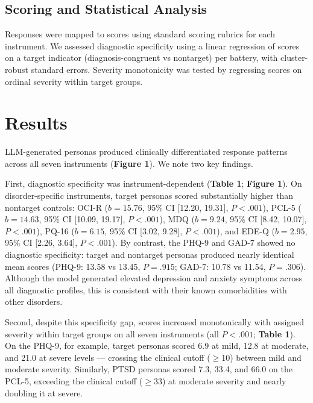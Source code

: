 \documentclass[12pt]{article}
\begin{document}
\subsection*{Scoring and Statistical Analysis}

Responses were mapped to scores using standard scoring rubrics for each instrument. We assessed diagnostic specificity using a linear regression of scores on a target indicator (diagnosis-congruent vs nontarget) per battery, with cluster-robust standard errors. Severity monotonicity was tested by regressing scores on ordinal severity within target groups.

\section*{Results}

LLM-generated personas produced clinically differentiated response patterns across all seven instruments (\textbf{Figure 1}). We note two key findings. 

First, diagnostic specificity was instrument-dependent (\textbf{Table 1}; \textbf{Figure 1}). On disorder-specific instruments, target personas scored substantially higher than nontarget controls: OCI-R ($b = 15.76$, 95\% CI [12.20, 19.31], $P < .001$), PCL-5 ($b = 14.63$, 95\% CI [10.09, 19.17], $P < .001$), MDQ ($b = 9.24$, 95\% CI [8.42, 10.07], $P < .001$), PQ-16 ($b = 6.15$, 95\% CI [3.02, 9.28], $P < .001$), and EDE-Q ($b = 2.95$, 95\% CI [2.26, 3.64], $P < .001$). By contrast, the PHQ-9 and GAD-7 showed no diagnostic specificity: target and nontarget personas produced nearly identical mean scores (PHQ-9: 13.58 vs 13.45, $P = .915$; GAD-7: 10.78 vs 11.54, $P = .306$). Although the model generated elevated depression and anxiety symptoms across all diagnostic profiles, this is consistent with their known comorbidities with other disorders\cite{McGrath._2020}.

\vspace{0.5em}

Second, despite this specificity gap, scores increased monotonically with assigned severity within target groups on all seven instruments (all $P < .001$; \textbf{Table 1}). On the PHQ-9, for example, target personas scored 6.9 at mild, 12.8 at moderate, and 21.0 at severe levels — crossing the clinical cutoff ($\geq$10) between mild and moderate severity. Similarly, PTSD personas scored 7.3, 33.4, and 66.0 on the PCL-5, exceeding the clinical cutoff ($\geq$33) at moderate severity and nearly doubling it at severe.
\end{document}
